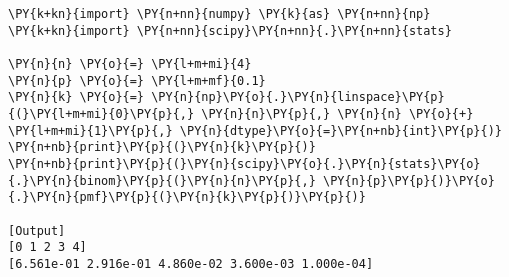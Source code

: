 \begin{Verbatim}[label=\makebox{\href{https://bitbucket.org/lbaldini/statnotes/src/master/snippets/scipy.stats.binom.py}{https://bitbucket.org/.../scipy.stats.binom.py}},commandchars=\\\{\}]
\PY{k+kn}{import} \PY{n+nn}{numpy} \PY{k}{as} \PY{n+nn}{np}
\PY{k+kn}{import} \PY{n+nn}{scipy}\PY{n+nn}{.}\PY{n+nn}{stats}

\PY{n}{n} \PY{o}{=} \PY{l+m+mi}{4}
\PY{n}{p} \PY{o}{=} \PY{l+m+mf}{0.1}
\PY{n}{k} \PY{o}{=} \PY{n}{np}\PY{o}{.}\PY{n}{linspace}\PY{p}{(}\PY{l+m+mi}{0}\PY{p}{,} \PY{n}{n}\PY{p}{,} \PY{n}{n} \PY{o}{+} \PY{l+m+mi}{1}\PY{p}{,} \PY{n}{dtype}\PY{o}{=}\PY{n+nb}{int}\PY{p}{)}
\PY{n+nb}{print}\PY{p}{(}\PY{n}{k}\PY{p}{)}
\PY{n+nb}{print}\PY{p}{(}\PY{n}{scipy}\PY{o}{.}\PY{n}{stats}\PY{o}{.}\PY{n}{binom}\PY{p}{(}\PY{n}{n}\PY{p}{,} \PY{n}{p}\PY{p}{)}\PY{o}{.}\PY{n}{pmf}\PY{p}{(}\PY{n}{k}\PY{p}{)}\PY{p}{)}

[Output]
[0 1 2 3 4]
[6.561e-01 2.916e-01 4.860e-02 3.600e-03 1.000e-04]
\end{Verbatim}